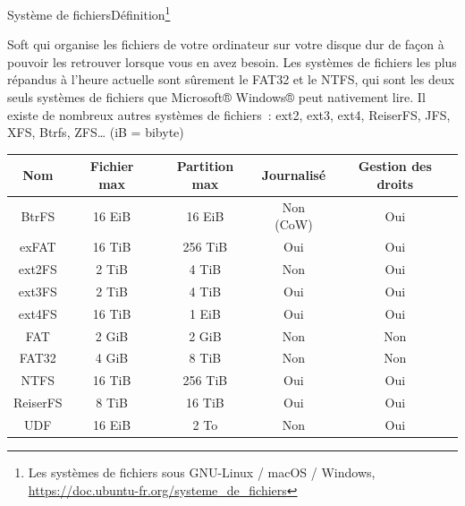 \documentclass{beamer}
\begin{document}
    \begin{frame}{Système de fichiers}{Définition\footnote{\label{fs}Les systèmes de fichiers sous GNU-Linux / macOS / Windows, \url{https://doc.ubuntu-fr.org/systeme_de_fichiers}}}
        \begin{footnotesize}
            Soft qui organise les fichiers de votre ordinateur sur votre disque dur de façon
            à pouvoir les retrouver lorsque vous en avez besoin.
            Les systèmes de fichiers les plus répandus à l'heure actuelle sont sûrement le FAT32 et
            le NTFS, qui sont les deux seuls systèmes de fichiers que Microsoft® Windows® peut nativement lire.
            Il existe de nombreux autres systèmes de fichiers~: ext2, ext3, ext4, ReiserFS, JFS, XFS, Btrfs, ZFS\ldots
            (iB = bibyte)
            \begin{table}[h!]
                \centering
                \begin{tabular}{|c|c|c|c|c|}
                    \hline
                    \textbf{Nom} & \textbf{Fichier max} & \textbf{Partition max} & \textbf{Journalisé} & \textbf{Gestion des droits} \\ \hline
                    BtrFS        & 16 EiB               & 16 EiB                 & Non (CoW)           & Oui                         \\ \hline
                    exFAT        & 16 TiB               & 256 TiB                & Oui                 & Oui                         \\ \hline
                    ext2FS       & 2 TiB                & 4 TiB                  & Non                 & Oui                         \\ \hline
                    ext3FS       & 2 TiB                & 4 TiB                  & Oui                 & Oui                         \\ \hline
                    ext4FS       & 16 TiB               & 1 EiB                  & Oui                 & Oui                         \\ \hline
                    FAT          & 2 GiB                & 2 GiB                  & Non                 & Non                         \\ \hline
                    FAT32        & 4 GiB                & 8 TiB                  & Non                 & Non                         \\ \hline
                    NTFS         & 16 TiB               & 256 TiB                & Oui                 & Oui                         \\ \hline
                    ReiserFS     & 8 TiB                & 16 TiB                 & Oui                 & Oui                         \\ \hline
                    UDF          & 16 EiB               & 2 To                   & Non                 & Oui                         \\ \hline
                \end{tabular}
            \end{table}
        \end{footnotesize}
    \end{frame}
\end{document}
